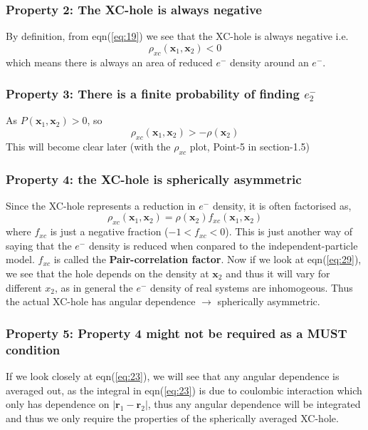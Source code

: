 \documentclass{article}
\begin{document}
\begin{Large}
\begin{flushleft}
    \subsubsection*{\Large{Property 2: The XC-hole is always negative}}
    By definition, from eqn(\ref{eq:19}) we see that the XC-hole is always negative i.e.
    \begin{equation}\label{eq:27}
    \rho_{xc}(\textbf{x}_1,\textbf{x}_2) < 0
    \end{equation}
    which means there is always an area of reduced $e^-$ density around an $e^-$.
    
    \subsubsection*{\Large{Property 3: There is a finite probability of finding $e^-_2$}}
    As $P(\textbf{x}_1,\textbf{x}_2) > 0$, so
    \begin{equation}\label{eq:28}
    \rho_{xc}(\textbf{x}_1,\textbf{x}_2) > -\rho(\textbf{x}_2)
    \end{equation} 
    This will become clear later (with the $\rho_{xc}$ plot, Point-5 in section-1.5)  
    \subsubsection*{\Large{Property 4: the XC-hole is spherically asymmetric}}
    Since the XC-hole represents a reduction in $e^-$ density, it is often factorised as,
    \begin{equation}\label{eq:29}
    \rho_{xc}(\textbf{x}_1,\textbf{x}_2) = \rho(\textbf{x}_2)f_{xc}(\textbf{x}_1,\textbf{x}_2)
    \end{equation}
    where $f_{xc}$ is just a negative fraction ($-1 < f_{xc}< 0$). This is just another way of saying that the $e^-$ density is reduced when conpared to the independent-particle model. $f_{xc}$ is called the \textbf{Pair-correlation factor}. Now if we look at eqn(\ref{eq:29}), we see that the hole depends on the density at $\textbf{x}_2$ and thus it will vary for different $x_2$, as in general the $e^-$ density of real systems are inhomogeous. Thus the actual XC-hole has angular dependence $\rightarrow$ spherically asymmetric.
    
    \subsubsection*{\Large{Property 5: Property 4 might not be required as a MUST condition}}
    If we look closely at eqn(\ref{eq:23}), we will see that any angular dependence is averaged out, as the integral in eqn(\ref{eq:23}) is due to coulombic interaction which only has dependence on $|\textbf{r}_1-\textbf{r}_2|$, thus any angular dependence will be integrated and thus we only require the properties of the spherically averaged XC-hole.
   \end{flushleft}
  \end{Large}
  
\end{document}
